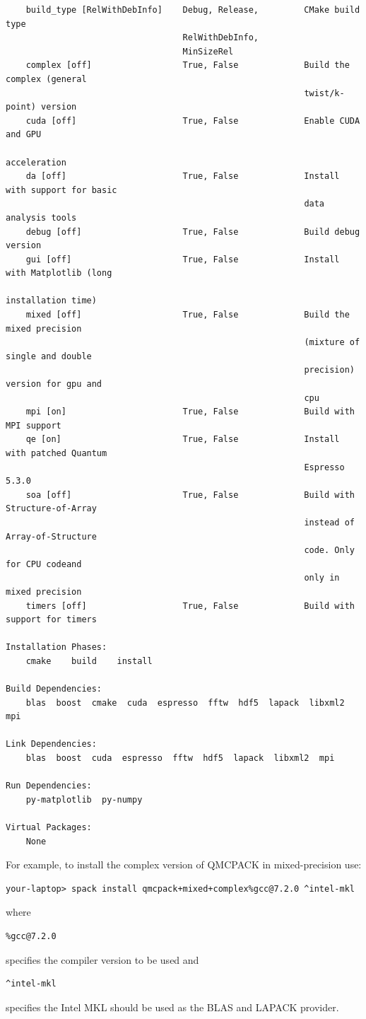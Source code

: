 \begin{verbatim}
    build_type [RelWithDebInfo]    Debug, Release,         CMake build type
                                   RelWithDebInfo,
                                   MinSizeRel
    complex [off]                  True, False             Build the complex (general
                                                           twist/k-point) version
    cuda [off]                     True, False             Enable CUDA and GPU
                                                           acceleration
    da [off]                       True, False             Install with support for basic
                                                           data analysis tools
    debug [off]                    True, False             Build debug version
    gui [off]                      True, False             Install with Matplotlib (long
                                                           installation time)
    mixed [off]                    True, False             Build the mixed precision
                                                           (mixture of single and double
                                                           precision) version for gpu and
                                                           cpu
    mpi [on]                       True, False             Build with MPI support
    qe [on]                        True, False             Install with patched Quantum
                                                           Espresso 5.3.0
    soa [off]                      True, False             Build with Structure-of-Array
                                                           instead of Array-of-Structure
                                                           code. Only for CPU codeand
                                                           only in mixed precision
    timers [off]                   True, False             Build with support for timers

Installation Phases:
    cmake    build    install

Build Dependencies:
    blas  boost  cmake  cuda  espresso  fftw  hdf5  lapack  libxml2  mpi

Link Dependencies:
    blas  boost  cuda  espresso  fftw  hdf5  lapack  libxml2  mpi

Run Dependencies:
    py-matplotlib  py-numpy

Virtual Packages:
    None
\end{verbatim}

For example, to install the complex version of QMCPACK in mixed-precision use:
\verbatimfont{\footnotesize}
\begin{verbatim}
your-laptop> spack install qmcpack+mixed+complex%gcc@7.2.0 ^intel-mkl
\end{verbatim}
where
\verbatimfont{\footnotesize}
\begin{verbatim}
%gcc@7.2.0
\end{verbatim}
specifies the compiler version to be used and
\verbatimfont{\footnotesize}
\begin{verbatim}
^intel-mkl
\end{verbatim}
specifies the Intel MKL should be used as the BLAS and LAPACK provider.


